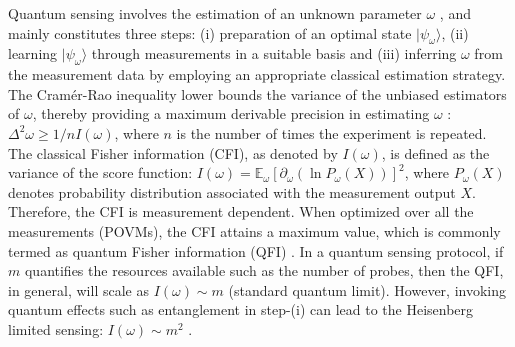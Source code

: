 \documentclass[amsmath,nobibnotes,aps,amssymb,pra, prl,aps,showpacs,superscriptaddress,twocolumn, longbibliography, reprint]{revtex4-2}
\begin{document}
Quantum sensing involves the estimation of an unknown parameter $\omega$ \cite{helstrom1969quantum}, and mainly constitutes three steps: (i) preparation of an optimal state $|\psi_{\omega}\rangle$, (ii) learning $|\psi_\omega\rangle$ through measurements in a suitable basis and (iii) inferring $\omega$ from the measurement data by employing an appropriate classical estimation strategy. The Cram\'{e}r-Rao inequality lower bounds the variance of the unbiased estimators of $\omega$, thereby providing a maximum derivable precision in estimating $\omega$ \cite{rao1992information, cramer1999mathematical}: $\Delta^2\omega\geq1/nI(\omega)$, where $n$ is the number of times the experiment is repeated. The classical Fisher information (CFI), as denoted by $I(\omega)$, is defined as the variance of the score function: $I(\omega)=\mathbb{E}_\omega\left[\partial_{\omega}(\ln P_{\omega}(X))\right]^2$, where $P_{\omega}(X)$ denotes probability distribution associated with the measurement output $X$. Therefore, the CFI is measurement dependent. When optimized over all the measurements (POVMs), the CFI attains a maximum value, which is commonly termed as quantum Fisher information (QFI) \cite{braunstein1994statistical, braunstein1996generalized}. In a quantum sensing protocol, if $m$ quantifies the resources available such as the number of probes, then the QFI, in general, will scale as $I(\omega)\sim m$ (standard quantum limit). However, invoking quantum effects such as entanglement in step-(i) can lead to the Heisenberg limited sensing: $I(\omega)\sim m^2$ \cite{giovannetti2004quantum, giovannetti2006quantum}.  
\end{document}
